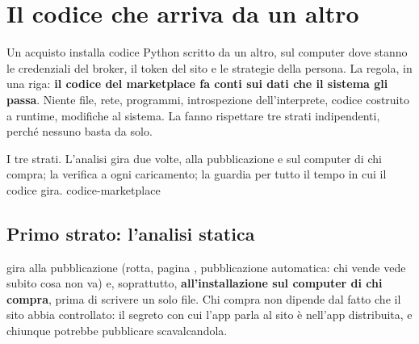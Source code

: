 \section{Il codice che arriva da un altro}\label{sez:codice-marketplace}

Un acquisto installa codice Python scritto da un altro, sul computer dove
stanno le credenziali del broker, il token del sito e le strategie della
persona. La regola, in una riga: \textbf{il codice del marketplace fa conti
sui dati che il sistema gli passa}. Niente file, rete, programmi,
introspezione dell'interprete, codice costruito a runtime, modifiche al
sistema. La fanno rispettare tre strati indipendenti, perché nessuno basta da
solo.

  {I tre strati. L'analisi gira due volte, alla pubblicazione e
   sul computer di chi compra; la verifica a ogni caricamento; la guardia
   per tutto il tempo in cui il codice gira.}
  {codice-marketplace}

\subsection{Primo strato: l'analisi statica}

 gira alla pubblicazione (rotta, pagina
, pubblicazione automatica: chi vende vede subito cosa non va) e,
soprattutto, \textbf{all'installazione sul computer di chi compra}, prima di
scrivere un solo file. Chi compra non dipende dal fatto che il sito abbia
controllato: il segreto con cui l'app parla al sito è nell'app distribuita, e
chiunque potrebbe pubblicare scavalcandola.


